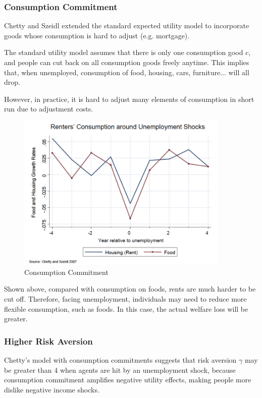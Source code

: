         \subsubsection{Consumption Commitment}
        Chetty and Szeidl extended the standard expected utility model to incorporate goods whose consumption is hard to adjust (e.g. mortgage).
        
        The standard utility model assumes that there is only one consumption good $c$, and people can cut back on all consumption goods freely anytime. This implies that, when unemployed, consumption of food, housing, cars, furniture... will all drop.
        
        However, in practice, it is hard to adjust many elements of consumption in short run due to adjustment costs.
        \begin{figure}[H]
            \centering
            \includegraphics[width=4in]{images/ch1/Chetty_1.png}
            \caption{Consumption Commitment}
            \label{fig:Chetty}
        \end{figure}
        Shown above, compared with consumption on foods, rents are much harder to be cut off. Therefore, facing unemployment, individuals may need to reduce more flexible consumption, such as foods. In this case, the actual welfare loss will be greater.
        \subsubsection{Higher Risk Aversion}
        Chetty's model with consumption commitments suggests that risk aversion $\gamma$ may be greater than 4 when agents are hit by an unemployment shock, because consumption commitment amplifies negative utility effects, making people more dislike negative income shocks.
        
